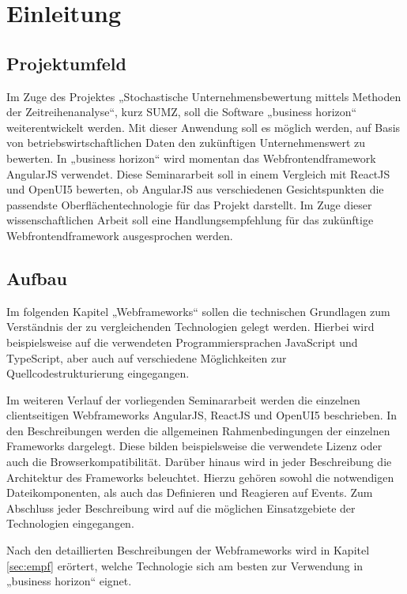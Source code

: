 
\chapter{Einleitung}

\section{Projektumfeld}

Im Zuge des Projektes „Stochastische Unternehmensbewertung mittels Methoden der Zeitreihenanalyse“, kurz SUMZ, soll die Software „business horizon“ weiterentwickelt werden. Mit dieser Anwendung soll es möglich werden, auf Basis von betriebswirtschaftlichen Daten den zukünftigen Unternehmenswert zu bewerten. In „business horizon“ wird momentan das Webfrontendframework AngularJS verwendet. Diese Seminararbeit soll in einem Vergleich mit ReactJS und OpenUI5 bewerten, ob AngularJS aus verschiedenen Gesichtspunkten die passendste Oberflächentechnologie für das Projekt darstellt. Im Zuge dieser wissenschaftlichen Arbeit soll eine Handlungsempfehlung für das zukünftige Webfrontendframework ausgesprochen werden.

\section{Aufbau}

Im folgenden Kapitel „Webframeworks“ sollen die technischen Grundlagen zum Verständnis der zu vergleichenden Technologien gelegt werden. Hierbei wird beispielsweise auf die verwendeten Programmiersprachen JavaScript und TypeScript, aber auch auf verschiedene Möglichkeiten zur Quellcodestrukturierung eingegangen. 

Im weiteren Verlauf der vorliegenden Seminararbeit werden die einzelnen clientseitigen Webframeworks AngularJS, ReactJS und OpenUI5 beschrieben. In den Beschreibungen werden die allgemeinen Rahmenbedingungen der einzelnen Frameworks dargelegt. Diese bilden beispielsweise die verwendete Lizenz oder auch die Browserkompatibilität. Darüber hinaus wird in jeder Beschreibung die Architektur des Frameworks beleuchtet. Hierzu gehören sowohl die notwendigen Dateikomponenten, als auch das Definieren und Reagieren auf Events. Zum Abschluss jeder Beschreibung wird auf die möglichen Einsatzgebiete der Technologien eingegangen.

Nach den detaillierten Beschreibungen der Webframeworks wird in Kapitel \ref{sec:empf} erörtert, welche Technologie sich am besten zur Verwendung in „business horizon“ eignet.